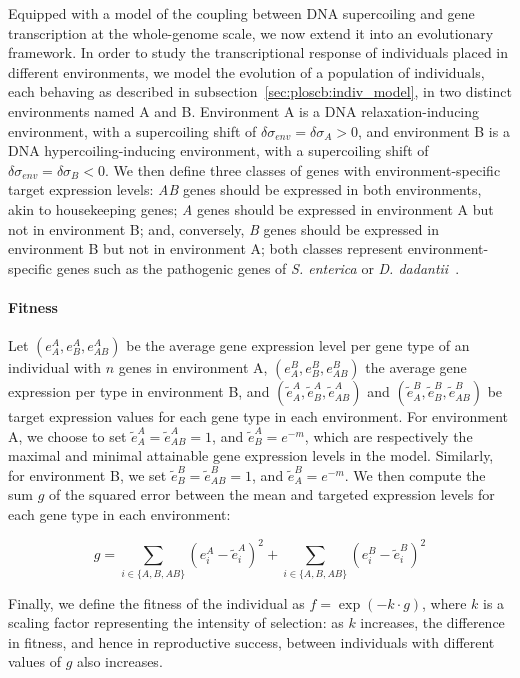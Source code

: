 Equipped with a model of the coupling between DNA supercoiling and gene transcription at the whole-genome scale, we now extend it into an evolutionary framework.
In order to study the transcriptional response of individuals placed in different environments, we model the evolution of a population of individuals, each behaving as described in subsection~\ref{sec:ploscb:indiv_model}, in two distinct environments named A and B.
Environment A is a DNA relaxation-inducing environment, with a supercoiling shift of $\delta\sigma_{env} = \delta\sigma_A > 0$, and environment B is a DNA hypercoiling-inducing environment, with a supercoiling shift of $\delta\sigma_{env} = \delta\sigma_B < 0$.
We then define three classes of genes with environment-specific target expression levels: \emph{AB} genes should be expressed in both environments, akin to housekeeping genes; \emph{A} genes should be expressed in environment A but not in environment B; and, conversely, \emph{B} genes should be expressed in environment B but not in environment A; both classes represent environment-specific genes such as the pathogenic genes of \emph{S. enterica} or \emph{D. dadantii}~\citep{cameron2012,herault2014}.

\paragraph{Fitness}
Let $(e^A_A, e^A_B, e^A_{AB})$ be the average gene expression level per gene type of an individual with $n$ genes in environment A, $(e^B_A, e^B_B, e^B_{AB})$ the average gene expression per type in environment B, and $(\tilde{e}^A_A, \tilde{e}^A_B, \tilde{e}^A_{AB})$ and $(\tilde{e}^B_A, \tilde{e}^B_B, \tilde{e}^B_{AB})$ be target expression values for each gene type in each environment.
For environment A, we choose to set $\tilde{e}^A_A = \tilde{e}^A_{AB} = 1$, and $\tilde{e}^A_B = e^{-m}$, which are respectively the maximal and minimal attainable gene expression levels in the model.
Similarly, for environment B, we set $\tilde{e}^B_B = \tilde{e}^B_{AB} = 1$, and $\tilde{e}^B_A = e^{-m}$.
We then compute the sum $g$ of the squared error between the mean and targeted expression levels for each gene type in each environment:

\begin{equation}
g = \sum_{i\in\{A, B, AB\}}\left(e^A_i - \tilde{e}^A_i\right)^2 + \sum_{i\in\{A, B, AB\}}\left(e^B_i - \tilde{e}^B_i\right)^2
\label{eq:gap}
\end{equation}

Finally, we define the fitness of the individual as $f = \exp(-k \cdot g)$, where $k$ is a scaling factor representing the intensity of selection: as $k$ increases, the difference in fitness, and hence in reproductive success, between individuals with different values of $g$ also increases.

